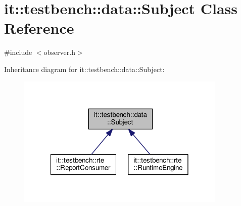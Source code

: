 \hypertarget{classit_1_1testbench_1_1data_1_1Subject}{\section{it\-:\-:testbench\-:\-:data\-:\-:Subject Class Reference}
\label{d7/db8/classit_1_1testbench_1_1data_1_1Subject}
}


{\ttfamily \#include $<$observer.\-h$>$}



Inheritance diagram for it\-:\-:testbench\-:\-:data\-:\-:Subject\-:
\nopagebreak
\begin{figure}[H]
\begin{center}
\leavevmode
\includegraphics[width=283pt]{dc/dfc/classit_1_1testbench_1_1data_1_1Subject__inherit__graph}
\end{center}
\end{figure}
